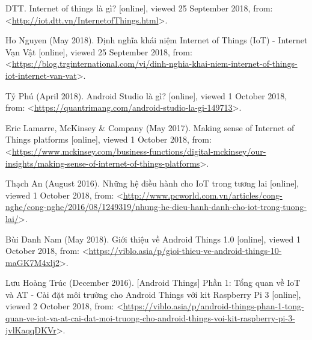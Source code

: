 \renewcommand{\bibname}{Tài liệu tham khảo}
\begin{thebibliography}{10}
\baselineskip
21pt

%
%


DTT. Internet of things là gì? [online], viewed 25 September 2018, from: <\href{http://iot.dtt.vn/InternetofThings.html}{http://iot.dtt.vn/InternetofThings.html}>.


Ho Nguyen (May 2018). Định nghĩa khái niệm Internet of Things (IoT) - Internet Vạn Vật [online], viewed 25 September 2018, from: <\href{https://blog.trginternational.com/vi/dinh-nghia-khai-niem-internet-of-things-iot-internet-van-vat}{https://blog.trginternational.com/vi/dinh-nghia-khai-niem-internet-of-things-iot-internet-van-vat}>.

Tỷ Phú (April 2018). Android Studio là gì? [online], viewed 1 October 2018, from: <\href{https://quantrimang.com/android-studio-la-gi-149713}{https://quantrimang.com/android-studio-la-gi-149713}>.

Eric Lamarre, McKinsey \& Company (May 2017). Making sense of Internet of Things platforms [online], viewed 1 October 2018, from: <\href{https://www.mckinsey.com/business-functions/digital-mckinsey/our-insights/making-sense-of-internet-of-things-platforms}{https://www.mckinsey.com/business-functions/digital-mckinsey/our-insights/making-sense-of-internet-of-things-platforms}>.

Thạch An (August 2016). Những hệ điều hành cho IoT trong tương lai [online], viewed 1 October 2018, from: <\href{http://www.pcworld.com.vn/articles/cong-nghe/cong-nghe/2016/08/1249319/nhung-he-dieu-hanh-danh-cho-iot-trong-tuong-lai/}{http://www.pcworld.com.vn/articles/cong-nghe/cong-nghe/2016/08/1249319/nhung-he-dieu-hanh-danh-cho-iot-trong-tuong-lai/}>.

Bùi Danh Nam (May 2018). Giới thiệu về Android Things 1.0 [online], viewed 1 October 2018, from: <\href{https://viblo.asia/p/gioi-thieu-ve-android-things-10-maGK7M4xlj2}{https://viblo.asia/p/gioi-thieu-ve-android-things-10-maGK7M4xlj2}>.

Lưu Hoàng Trúc (December 2016). [Android Things] Phần 1: Tổng quan về IoT và AT - Cài đặt môi trường cho Android Things với kit Raspberry Pi 3 [online], viewed 2 October 2018, from: <\href{https://viblo.asia/p/android-things-phan-1-tong-quan-ve-iot-va-at-cai-dat-moi-truong-cho-android-things-voi-kit-raspberry-pi-3-jvlKaqqDKVr}{https://viblo.asia/p/android-things-phan-1-tong-quan-ve-iot-va-at-cai-dat-moi-truong-cho-android-things-voi-kit-raspberry-pi-3-jvlKaqqDKVr}>.


\end{thebibliography}

